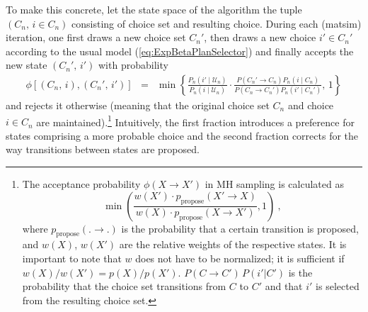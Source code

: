 To make this concrete, let  the state space of the algorithm
 the tuple $(C_{n},\, i\in C_{n})$ consisting of choice set and
resulting choice.  During each (\gls{matsim}) iteration, one first draws a new
choice set $C_{n}'$, then draws a new choice $i'\in C_{n}'$ according to the
usual model (\ref{eq:ExpBetaPlanSelector}) and finally accepts the new state
$(C_{n}',\, i')$ with probability
\begin{eqnarray}
\phi[(C_{n},\, i),(C_{n}',\, i')] 
& = & 
\min\left\{ 
\frac{{\displaystyle P_{n}(i'\mid \mathcal{U}_n)}}
{{\displaystyle P_{n}(i\mid \mathcal{U}_n)}}
\cdot
\frac{{P(C_{n}'\rightarrow C_{n})P_n(i\mid C_{n})}}
{{P(C_{n}\rightarrow C_{n}')P_n(i'\mid C_{n}')}}
,\,1\right\} 
\label{eq:accept-proba-1}
\end{eqnarray}
and rejects it otherwise (meaning that the original choice set $C_{n}$
and choice $i\in C_{n}$ are maintained).\footnote{%
%
The acceptance probability $\phi(X \to X')$ in MH sampling is calculated as
\[
\min\left(\frac{w(X') \cdot p_\text{propose}(X' \to X)}{w(X) \cdot
p_\text{propose}(X \to X')},1\right) \ ,
\]
where $p_\text{propose}(. \to .)$ is the probability that a certain transition
is proposed, and $w(X)$, $w(X')$ are the relative weights of the respective states.  
It is important to note that $w$ does not have to be normalized; 
it is sufficient if $w(X)/w(X') = p(X)/p(X')$.  
$P(C \to C') \, P(i'|C')$ is the probability that the choice set transitions from $C$ to $C'$
and that $i'$ is selected from the resulting choice set.
%
}
Intuitively, the first fraction introduces a preference for states
comprising a more probable choice and the second
fraction corrects for the way transitions between states are
proposed.


